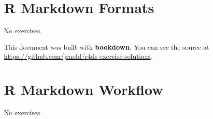 \documentclass[]{book}
\theoremstyle{definition}
\theoremstyle{definition}
\theoremstyle{definition}
\theoremstyle{remark}
\begin{document}
\hypertarget{r-markdown-formats}{%
\chapter{R Markdown Formats}\label{r-markdown-formats}}

No exercises.

This document was built with \textbf{bookdown}. You can see the source
at \url{https://github.com/jrnold/r4ds-exercise-solutions}.

\hypertarget{r-markdown-workflow}{%
\chapter{R Markdown Workflow}\label{r-markdown-workflow}}

No exercises
\end{document}
